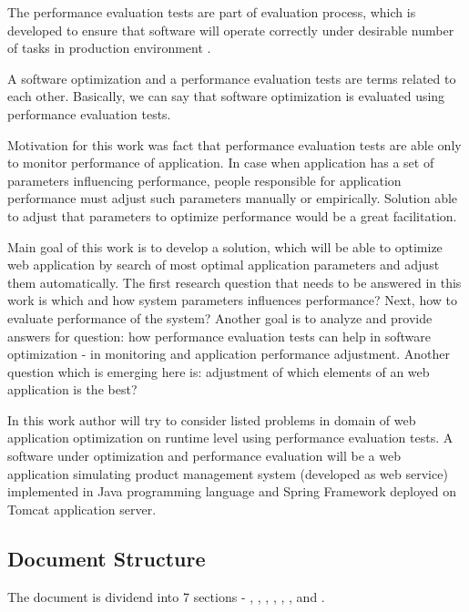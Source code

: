 \documentclass[10pt,a4paper]{article}
\begin{document}
The performance evaluation tests are part of evaluation process, which is developed to ensure that software will operate correctly under desirable number of tasks in production environment \cite{analysisofpet}.   

A software optimization and a performance evaluation tests are terms related to each other. Basically, we can say that software optimization is evaluated using performance evaluation tests. 

Motivation for this work was fact that performance evaluation tests are able only to monitor performance of application. In case when application has a set of parameters influencing performance, people responsible for application performance must adjust such parameters manually or empirically. Solution able to adjust that parameters to optimize performance would be a great facilitation. 

Main goal of this work is to develop a solution, which will be able to optimize web application by search of most optimal application parameters and adjust them automatically. The first research question that needs to be answered in this work is which and how system parameters influences performance? Next, how to evaluate performance of the system? Another goal is to analyze and provide answers for question: how performance evaluation tests can help in software optimization - in monitoring and application performance adjustment. Another question which is emerging here is: adjustment of which elements of an web application is the best? 

In this work author will try to consider listed problems in domain of web application optimization on runtime level using performance evaluation tests. A software under optimization and performance evaluation will be a web application simulating product management system (developed as web service) implemented in Java programming language and Spring Framework deployed on Tomcat application server. 

\pagebreak
\subsection{Document Structure}

The document is dividend into 7 sections - 
\textit{}, 
\textit{}, 
\textit{}, 
\textit{}, 
\textit{}, 
\textit{}, 
\textit{} and 
\textit{}. 
\end{document}
